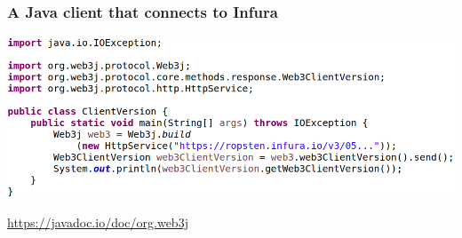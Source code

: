 \documentclass[11pt]{beamer}  %
\begin{document}
\begin{frame}\frametitle{A Java client that connects to Infura}

  \begin{center}
    \includegraphics[width=\textwidth,clip=false]{pictures/client-version-java.png}
  \end{center}

  \bigskip

  \url{https://javadoc.io/doc/org.web3j}

\end{frame}
\end{document}
